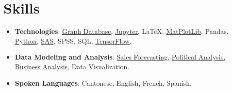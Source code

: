 \documentclass[letterpaper,11pt]{article}
\newcommand{\resumeItem}[2]{
  \item\small{
    \textbf{#1}{: #2 \vspace{-2pt}}
  }
}
\newcommand{\resumeSubItem}[2]{\resumeItem{#1}{#2}\vspace{-4pt}}
\newcommand{\resumeSubHeadingListStart}{\begin{itemize}[leftmargin=*]}
\newcommand{\resumeSubHeadingListEnd}{\end{itemize}}
\begin{document}
\section{Skills}
\resumeSubHeadingListStart
  \resumeSubItem{Technologies}
    {{\href{https://docs.jnapolitano.io/parts/data/graph-database/index.html}{Graph Database}}, {\href{https://docs.jnapolitano.io/parts/analysis/business-analysis/project-retail-sales-forecasting/code-base/SalesForcasting.html}{Jupyter}}, LaTeX, {\href{https://docs.jnapolitano.io/parts/analysis/business-analysis/project-retail-sales-forecasting/code-base/SalesForcasting.html}{MatPlotLib}}, Pandas, {\href{https://docs.jnapolitano.io/index.html}{Python}}, {\href{https://docs.jnapolitano.io/parts/data/experimental-design/index.html}{SAS}, SPSS, SQL, \href{https://docs.jnapolitano.io/parts/ml-ai/index.html}{TensorFlow}}.}
  \resumeSubItem{Data Modeling and Analysis}
    {\href{https://docs.jnapolitano.io/parts/analysis/business-analysis/project-retail-sales-forecasting/code-base/SalesForcasting.html}{Sales Forecasting,} {\href{https://docs.jnapolitano.io/parts/analysis/political-analysis/index.html}{Political Analysis,}} {\href{https://docs.jnapolitano.io/parts/analysis/business-analysis/index.html}{Business Analysis,}} Data Visualization.}
  \resumeSubItem{Spoken Languages}
    {Cantonese, English, French, Spanish.}
\resumeSubHeadingListEnd
\end{document}
